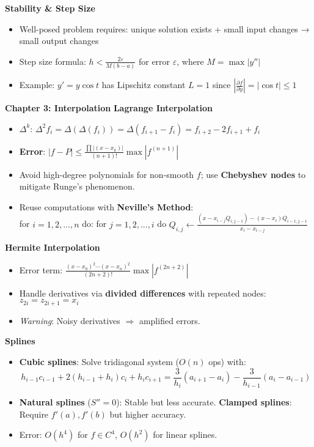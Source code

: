 \documentclass{article}
\begin{document}
\begin{minipage}[t]{0.49\textwidth}
    \textbf{Stability \& Step Size}
    \begin{itemize}
    \item Well-posed problem requires: unique solution exists + small input changes → small output changes
    \item Step size formula: $h < \frac{2\varepsilon}{M(b-a)}$ for error $\varepsilon$, where $M = \max|y''|$
    \item Example: $y'=y\cos t$ has Lipschitz constant $L=1$ since $|\frac{\partial f}{\partial y}| = |\cos t| \leq 1$
    \end{itemize}
\textbf{Chapter 3: Interpolation}
\textbf{Lagrange Interpolation}
\begin{itemize}
    \item \textbf{$\Delta^k$}: $\Delta^2f_i=\Delta(\Delta(f_i))=\Delta(f_{i+1}-f_i)=f_{i+2}-2f_{i+1}+f_i$
    \item \textbf{Error}: \( |f-P| \leq \frac{\prod|(x-x_k)|}{(n+1)!}\max|f^{(n+1)}| \)
    \item Avoid high-degree polynomials for non-smooth \( f \); use \textbf{Chebyshev nodes} to mitigate Runge's phenomenon.
    \item Reuse computations with \textbf{Neville's Method}:\\ for $i=1,2,...,n$ do: for $j=1,2,...,i$ do $Q_{i,j} \leftarrow \frac{(x-x_{i-j}Q_{i,j-1})-(x-x_i)Q_{i-1,j-1}}{x_i-x_{i-j}}$
\end{itemize}

\textbf{Hermite Interpolation}
\begin{itemize}
    \item Error term: \( \frac{(x-x_0)^2\cdots(x-x_n)^2}{(2n+2)!}\max|f^{(2n+2)}| \)
    \item Handle derivatives via \textbf{divided differences} with repeated nodes: \( z_{2i}=z_{2i+1}=x_i \)
    \item \textit{Warning}: Noisy derivatives \(\Rightarrow\) amplified errors.
\end{itemize}

\textbf{Splines}
\begin{itemize}
    \item \textbf{Cubic splines}: Solve tridiagonal system (\(O(n)\) ops) with:
        \[ h_{i-1}c_{i-1} + 2(h_{i-1}+h_i)c_i + h_ic_{i+1} = \frac{3}{h_i}(a_{i+1}-a_i) - \frac{3}{h_{i-1}}(a_i-a_{i-1}) \]
    \item \textbf{Natural splines} (\(S''=0\)): Stable but less accurate.  
    \textbf{Clamped splines}: Require \(f'(a), f'(b)\) but higher accuracy.
    \item Error: \( O(h^4) \) for \( f \in C^4 \), \( O(h^2) \) for linear splines.
\end{itemize}


\end{minipage}
\end{document}
